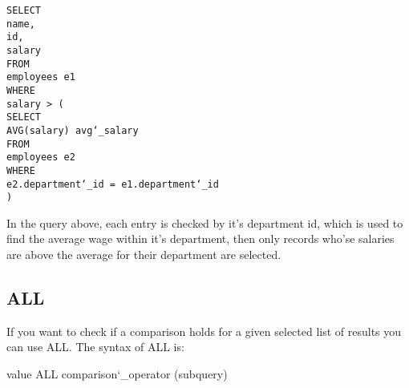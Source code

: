 \documentclass[10pt, english]{article}
\begin{document}
\texttt{SELECT \\
\hspace*{10pt} name, \\
\hspace*{10pt} id, \\
\hspace*{10pt} salary  \\
FROM \\
\hspace*{10pt} employees e1\\
WHERE \\
\hspace*{10pt} salary > ( \\
\hspace*{10pt} \hspace*{10pt} SELECT \\
\hspace*{10pt} \hspace*{10pt} \hspace*{10pt} AVG(salary) avg\char`_salary \\
\hspace*{10pt} \hspace*{10pt} FROM \\
\hspace*{10pt} \hspace*{10pt} \hspace*{10pt} employees e2  \\
\hspace*{10pt} \hspace*{10pt} WHERE \\
\hspace*{10pt} \hspace*{10pt} \hspace*{10pt} e2.department\char`_id =  e1.department\char`_id \\
\hspace*{10pt} ) 
}

In the query above, each entry is checked by it's department id, which is used to find the average wage within it's department,
then only records who'se salaries are above the average for their department are selected.

\subsection{ALL}
If you want to check if a comparison holds for a given selected list of results you can use ALL. The syntax of ALL is:

\begin{texttt} value ALL comparison\char`_operator (subquery) \end{texttt}
\end{document}
